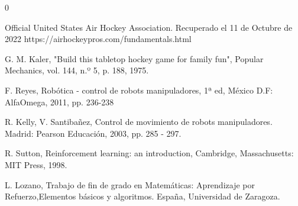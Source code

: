 \documentclass[12pt,spanish, singlespacing,]{MastersDoctoralThesis}
\newcommand\blankpage{%
    \null
    \thispagestyle{empty}%
    \addtocounter{page}{0}%
    \newpage}
\begin{document}
\begin{thebibliography}{0}
 
  Official United States Air Hockey Association. Recuperado el 11 de Octubre de 2022 https://airhockeypros.com/fundamentals.html
 
  G. M. Kaler, "Build this tabletop hockey game for family fun", Popular Mechanics, vol. 144, n.º 5, p. 188, 1975. 
 
   F. Reyes, Robótica - control de robots manipuladores, 1ª ed, México D.F: AlfaOmega, 2011, pp. 236-238
  
   R. Kelly, V. Santibañez, Control de movimiento de robots manipuladores. Madrid: Pearson Educación, 2003, pp. 285 - 297.
  
   R. Sutton, Reinforcement learning: an introduction, Cambridge, Massachusetts: MIT Press, 1998.
  
   L. Lozano, Trabajo de fin de grado en Matemáticas: Aprendizaje por Refuerzo,Elementos básicos y algoritmos. España, Universidad de Zaragoza.

\end{thebibliography}
\afterpage{\blankpage}

\appendix



\end{document}
